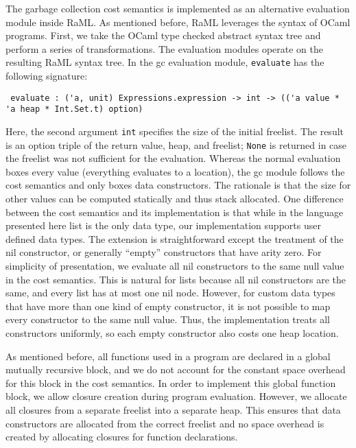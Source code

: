 \documentclass{easychair}
\theoremstyle{definition}
\begin{document}
The garbage collection cost semantics is implemented as an alternative evaluation module inside
RaML. As mentioned before, RaML leverages the syntax of OCaml programs.
First, we take the OCaml type checked abstract syntax tree and perform a series of transformations. 
The evaluation modules operate on the resulting RaML syntax tree. 
In the gc evaluation module, \texttt{evaluate} has the following signature:
\begin{minipage}{1.0\linewidth}
\small
\vspace{2ex}
\begin{verbatim}
 evaluate : ('a, unit) Expressions.expression -> int -> (('a value * 'a heap * Int.Set.t) option) 
\end{verbatim}
\vspace{0ex}
\end{minipage}

Here, the second argument \texttt{int} specifies the size of the initial freelist.
The result is an option triple of the return value, heap, and freelist; \texttt{None} is returned
in case the freelist was not sufficient for the evaluation.
%
Whereas the normal evaluation boxes every value (everything evaluates to a location), 
the gc module follows the cost semantics and only boxes data constructors. The rationale is
that the size for other values can be computed statically and thus stack allocated. One difference
between the cost semantics and its implementation is that while in the language presented here
list is the only data type, our implementation supports user defined data types. The extension
is straightforward except the treatment of the nil constructor, or generally ``empty'' constructors
that have arity zero. For simplicity of presentation, we evaluate all nil constructors to
the same null value in the cost semantics. This is natural for lists because all nil constructors 
are the same, and every list has at most one nil node. However, for custom data types that have 
more than one kind of empty constructor, it is not possible to map every constructor to the same 
null value. Thus, the implementation treats all constructors uniformly, so each empty constructor
also costs one heap location. 

As mentioned before, all functions used in a program are declared in a global mutually 
recursive block, and we do not account for the constant space overhead for this block in 
the cost semantics.  In order to implement this global function block, we allow closure creation
during program evaluation. However, we allocate all closures from a separate freelist into 
a separate heap.  This ensures that data constructors are allocated from the correct freelist 
and no space overhead is created by allocating closures for function declarations.
\end{document}
